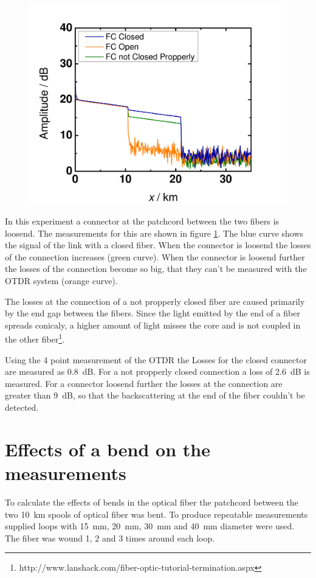 \begin{figure}%
\centering
\includegraphics[width=.7\columnwidth]{grafiken/Connector.pdf}%
\caption{}%
\label{fig:connector}%
\end{figure}

In this experiment a connector at the patchcord between the two fibers is loosend. The measurements for this are shown in figure \ref{fig:connector}. The blue curve shows the signal of the link with a closed fiber. When the connector is loosend the losses of the connection increases (green curve). When the connector is loosend further the losses of the connection become so big, that they can't be measured with the OTDR system (orange curve). 

The losses at the connection of a not propperly closed fiber are caused primarily by the end gap between the fibers. Since the light emitted by the end of a fiber spreads conicaly, a higher amount of light misses the core and is not coupled in the other fiber\footnote[4]{http://www.lanshack.com/fiber-optic-tutorial-termination.aspx}.

Using the 4 point measurement of the OTDR the Losses for the closed connector are measured as 0.8~dB. For a not propperly closed connection a loss of 2.6~dB is measured. For a connector loosend further the losses at the connection are greater than 9~dB, so that the backscattering at the end of the fiber couldn't be detected.

\section{Effects of a bend on the measurements}
To calculate the effects of bends in the optical fiber the patchcord between the two 10~km spools of optical fiber was bent. To produce repeatable measurements supplied loops with 15~mm, 20~mm, 30~mm and 40~mm diameter were used. The fiber was wound 1, 2 and 3 times around each loop. 

